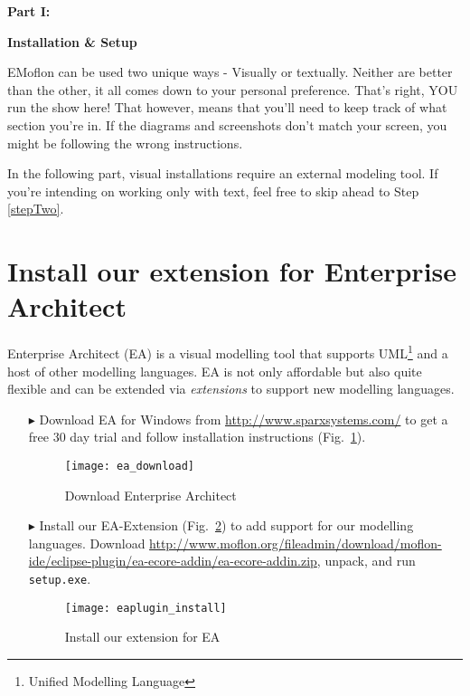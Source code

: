 {\bf \huge Part I:}

\vspace{0.5cm}

{\bf \Huge Installation \& Setup }

\vspace{0.5cm}
EMoflon can be used two unique ways - Visually or textually. Neither are better than the other, it all comes down to your personal preference. That's right, YOU run the show here!
That however, means that you'll need to keep track of what section you're in. If the diagrams and screenshots don't match your screen, you might be following the wrong instructions.

In the following part, visual installations require an external modeling tool. If you're intending on working only with text, feel free to skip ahead to Step \ref{stepTwo}. 

\section{Install our extension for Enterprise Architect}
\label{stepOne}
Enterprise Architect (EA) is a visual modelling tool that supports UML\footnote{Unified Modelling Language} and a host of other modelling languages.
EA is not only affordable but also quite flexible and can be extended via \emph{extensions} to support new modelling languages.
\begin{enumerate}
  
\item[$\blacktriangleright$] Download EA for Windows from \url{http://www.sparxsystems.com/} to get a free 30 day trial and follow installation instructions (Fig.~\ref{fig_enterpriseArchitextHomepage}).

\begin{figure}[htbp]
	\centering
  	\texttt{[image: ea\_download]}
	\caption{Download Enterprise Architect}
	\label{fig_enterpriseArchitextHomepage}
\end{figure} 

\item[$\blacktriangleright$] Install our EA-Extension (Fig.~\ref{fig_eaPluginWizard}) to add support for our modelling languages.
Download \url{http://www.moflon.org/fileadmin/download/moflon-ide/eclipse-plugin/ea-ecore-addin/ea-ecore-addin.zip}, unpack, and run \texttt{setup.exe}.

\begin{figure}[htbp]
	\centering
  \texttt{[image: eaplugin\_install]}
	\caption{Install our extension for EA}
	\label{fig_eaPluginWizard}
\end{figure}
\end{enumerate}
 
